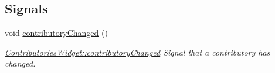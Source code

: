 \subsection*{Signals}
\begin{DoxyCompactItemize}
\item 
\hypertarget{classGui_1_1Widgets_1_1ContributoriesWidget_a510bfd755cf271fd10b63cf68284cd02}{}void \hyperlink{classGui_1_1Widgets_1_1ContributoriesWidget_a510bfd755cf271fd10b63cf68284cd02}{contributory\+Changed} ()\label{classGui_1_1Widgets_1_1ContributoriesWidget_a510bfd755cf271fd10b63cf68284cd02}

\begin{DoxyCompactList}\small\item\em \hyperlink{classGui_1_1Widgets_1_1ContributoriesWidget_a510bfd755cf271fd10b63cf68284cd02}{Contributories\+Widget\+::contributory\+Changed} Signal that a contributory has changed. \end{DoxyCompactList}\end{DoxyCompactItemize}
